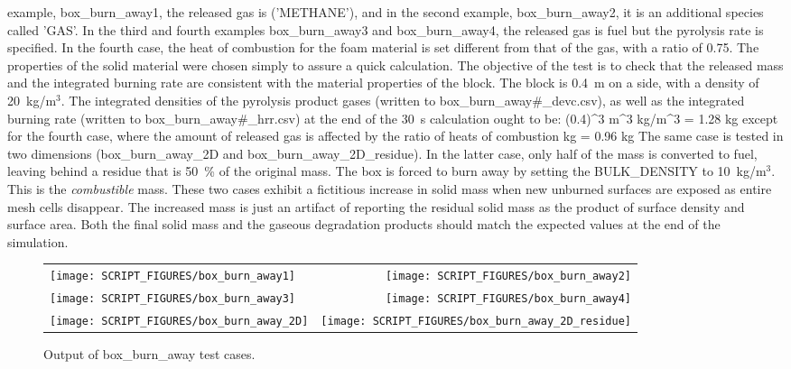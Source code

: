 \documentclass[11pt]{book}
\begin{document}
example, {\ct box\_burn\_away1}, the released gas is ({\ct 'METHANE'}), and in the second example, {\ct box\_burn\_away2}, it is an additional species called {\ct 'GAS'}. In the third and fourth examples {\ct box\_burn\_away3} and {\ct box\_burn\_away4}, the released gas is fuel but the pyrolysis rate is specified. In the fourth case, the heat of combustion for the foam material is set different from that of the gas, with a ratio of 0.75. The properties of the solid material were chosen simply to assure a quick calculation. The objective of the test is to
check that the released mass and the integrated burning rate are consistent with the material properties of the block. The block is 0.4~m on a side, with a density of 20~kg/m$^3$.  The integrated densities of the pyrolysis product gases (written to {\ct box\_burn\_away\#\_devc.csv}), as well as the integrated burning rate (written to {\ct box\_burn\_away\#\_hrr.csv}) at
the end of the 30~s calculation ought to be:
\be
(0.4)^3 \; \hbox{m}^3  \; \hbox{kg/m}^3 = 1.28 \; \hbox{kg}
\ee
except for the fourth case, where the amount of released gas is affected by the ratio of heats of combustion
  \; \hbox{kg}\; = 0.96 \; \hbox{kg}
\ee
The same case is tested in two dimensions ({\ct box\_burn\_away\_2D} and {\ct box\_burn\_away\_2D\_residue}). In the latter case, only half of the mass is converted to fuel, leaving behind a residue that is 50~\% of the original mass. The box is forced to burn away by setting the {\ct BULK\_DENSITY} to 10~kg/m$^3$. This is the {\em combustible} mass. These two cases exhibit a fictitious increase in solid mass when new unburned surfaces are exposed as entire mesh cells disappear. The increased mass is just an artifact of reporting the residual solid mass as the product of surface density and surface area. Both the final solid mass and the gaseous degradation products should match the expected values at the end of the simulation.
\begin{figure}[p]
\begin{tabular*}{\textwidth}{lr}
\texttt{[image: SCRIPT\_FIGURES/box\_burn\_away1]} &
\texttt{[image: SCRIPT\_FIGURES/box\_burn\_away2]} \\
\texttt{[image: SCRIPT\_FIGURES/box\_burn\_away3]} &
\texttt{[image: SCRIPT\_FIGURES/box\_burn\_away4]} \\
\texttt{[image: SCRIPT\_FIGURES/box\_burn\_away\_2D]} &
\texttt{[image: SCRIPT\_FIGURES/box\_burn\_away\_2D\_residue]} \\
\end{tabular*}
\caption[Results of the {\ct box\_burn\_away} test cases]{Output of {\ct box\_burn\_away} test cases.}
\label{box_burn_away}
\end{figure}
\end{document}
